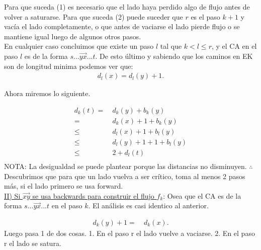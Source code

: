 \documentclass{article}
\begin{document}
Para que suceda (1) es necesario que el lado haya perdido algo de flujo antes de volver a saturarse.
Para que suceda (2) puede suceder que $r$ es el paso $k+1$ y vacía el lado completamente, o que
antes de vaciarse el lado pierde flujo o se mantiene igual luego de algunos otros pasos.\\
En cualquier caso concluimos que existe un paso $l$ tal que $k<l\leq r$, y el CA en el paso
$l$ es de la forma $s...\overrightarrow{yx}...t$. De esto último y sabiendo que los caminos en
EK son de longitud minima podemos ver que:
\begin{equation}
	\begin{aligned}
		d_l(x) = d_l(y) + 1. 
	\end{aligned}
\end{equation}

Ahora miremos lo siguiente.

\begin{equation}
	\begin{aligned}
		d_k(t) =& \ d_k(y) + b_k(y)\\
			=& \ d_k(x) + 1 + b_k(y)\\
			\leq & \ d_l(x) + 1 + b_l(y)\\
			\leq& \ d_l(y) +1 + 1 + b_l(y)\\
			\leq& \ 2 + d_l(t)\\

	\end{aligned}
\end{equation}
NOTA: La desigualdad se puede plantear porque las distancias no disminuyen.
$\therefore$ Descubrimos que para que un lado vuelva a ser crítico, toma al menos 2 pasos más, 
si el lado primero se usa forward.\\

\underline{II) Si $\overrightarrow{xy}$ se usa backwards para construir el flujo $f_k$}: Osea que
el CA es de la forma $s...\overrightarrow{yx}...t$ en el paso $k$. El análisis es casi identico
al anterior.

\begin{equation}
	\begin{aligned}
		d_k(y) + 1 =& \ d_k(x).
	\end{aligned}
\end{equation}
Luego pasa 1 de dos cosas.
1. En el paso r el lado vuelve a vaciarse.
2. En el paso r el lado se satura.
\end{document}
